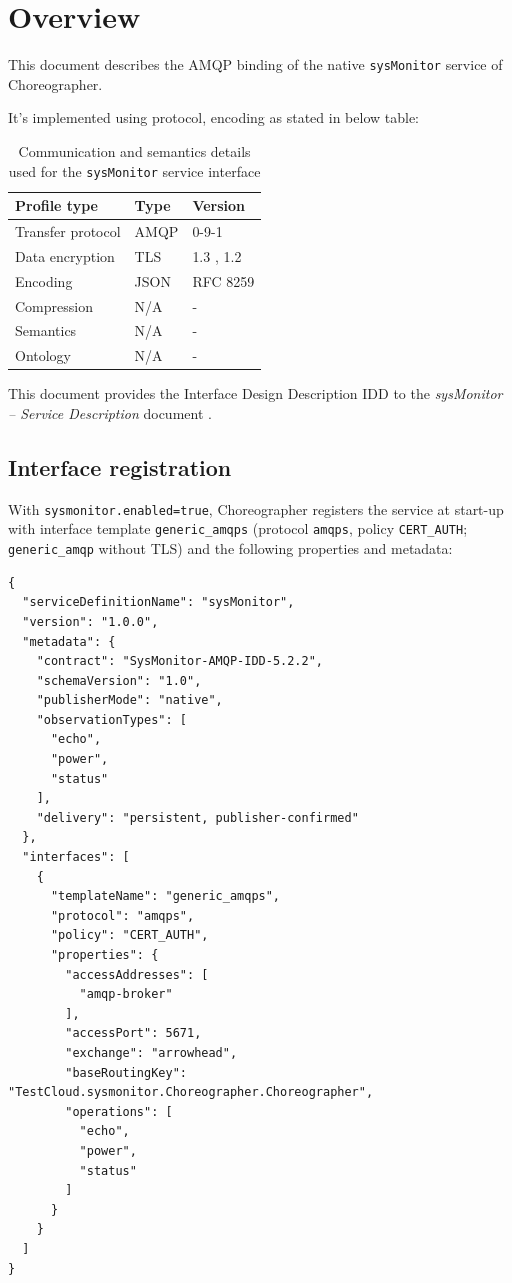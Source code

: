 \documentclass[a4paper]{arrowhead}
\begin{document}
\section{Overview}
\label{sec:overview}

This document describes the AMQP binding of the native \texttt{sysMonitor} service of Choreographer.

It's implemented using protocol, encoding as stated in below table:
\begin{table}[ht!]
  \centering
  \begin{tabular}{|l|l|l|}
    \hline
    \rowcolor{gray!33} Profile type & Type & Version \\ \hline
    Transfer protocol & AMQP & 0-9-1 \cite{amqp091} \\ \hline
    Data encryption & TLS & 1.3 \cite{rfc8446}, 1.2 \cite{rfc5246} \\ \hline
    Encoding & JSON & RFC 8259 \cite{rfc8259} \\ \hline
    Compression & N/A & - \\ \hline
    Semantics & N/A & - \\ \hline
    Ontology & N/A & - \\ \hline
  \end{tabular}
  \caption{Communication and semantics details used for the \texttt{sysMonitor} service interface}
  \label{tab:comunication_semantics_profile}
\end{table}

This document provides the Interface Design Description IDD to the \textit{sysMonitor -- Service Description} document \cite{cho-sysMonitor-sd}.

\subsection{Interface registration}

With \texttt{sysmonitor.enabled=true}, Choreographer registers the service at start-up with interface template \texttt{generic\_\allowbreak{}amqps} (protocol \texttt{amqps}, policy \texttt{CERT\_\allowbreak{}AUTH}; \texttt{generic\_\allowbreak{}amqp} without TLS) and the following properties and metadata:

\begin{lstlisting}[caption={Registered service instance (TestCloud).}]
{
  "serviceDefinitionName": "sysMonitor",
  "version": "1.0.0",
  "metadata": {
    "contract": "SysMonitor-AMQP-IDD-5.2.2",
    "schemaVersion": "1.0",
    "publisherMode": "native",
    "observationTypes": [
      "echo",
      "power",
      "status"
    ],
    "delivery": "persistent, publisher-confirmed"
  },
  "interfaces": [
    {
      "templateName": "generic_amqps",
      "protocol": "amqps",
      "policy": "CERT_AUTH",
      "properties": {
        "accessAddresses": [
          "amqp-broker"
        ],
        "accessPort": 5671,
        "exchange": "arrowhead",
        "baseRoutingKey": "TestCloud.sysmonitor.Choreographer.Choreographer",
        "operations": [
          "echo",
          "power",
          "status"
        ]
      }
    }
  ]
}
\end{lstlisting}
\end{document}
